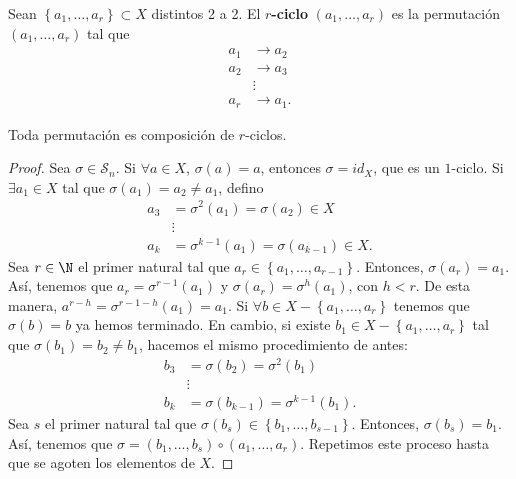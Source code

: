 \begin{fdefinition}[]
\normalfont Sean $\displaystyle \left\{ a_{1}, \ldots, a_{r}\right\} \subset X $ distintos 2 a 2. El \textbf{ $\displaystyle r $-ciclo} $\displaystyle \left(a_{1}, \ldots, a_{r}\right) $ es la permutación $\displaystyle \left(a_{1}, \ldots, a_{r}\right) $ tal que
\[
\begin{split}
	a_{1} & \to a_{2} \\
	a_{2} & \to a_{3} \\
	      & \vdots \\
	a_{r} & \to a_{1}.
\end{split}
\]
\end{fdefinition}

\begin{fprop}[]
\normalfont Toda permutación es composición de $\displaystyle r $-ciclos.
\end{fprop}

\begin{proof}
Sea $\displaystyle \sigma \in \mathcal{S}_{n} $. Si $\displaystyle \forall a \in X $, $\displaystyle \sigma\left(a\right)=a $, entonces $\displaystyle \sigma = id _{X} $, que es un $\displaystyle 1 $-ciclo. Si $\displaystyle \exists a_{1}\in X $ tal que $\displaystyle \sigma\left(a_{1}\right) = a_{2}\neq a_{1} $, defino
\[
\begin{split}
	a_{3} & = \sigma^{2}\left(a_{1}\right) = \sigma\left(a_{2}\right) \in X \\
	      & \vdots \\
	a_{k} & = \sigma^{k-1}\left(a_{1}\right) = \sigma\left(a_{k-1}\right) \in X.
\end{split}
\]
Sea $\displaystyle r \in \N $ el primer natural tal que $\displaystyle a_{r} \in \left\{ a_{1}, \ldots, a_{r-1}\right\}  $. Entonces, $\displaystyle \sigma\left(a_{r}\right) = a_{1} $. Así, tenemos que $a_{r} = \sigma^{r-1}\left(a_{1}\right)$ y $\displaystyle \sigma\left(a_{r}\right) = \sigma^{h}\left(a_{1}\right) $, con $\displaystyle h < r $. De esta manera, $\displaystyle a^{r-h} = \sigma^{r-1-h}\left(a_{1}\right) = a_{1} $. Si $\displaystyle \forall b \in X - \left\{ a_{1}, \ldots, a_{r}\right\}  $ tenemos que $\displaystyle \sigma\left(b\right) = b $ ya hemos terminado. En cambio, si existe $\displaystyle b_{1} \in X - \left\{ a_{1}, \ldots, a_{r}\right\}  $ tal que $\displaystyle \sigma\left(b_{1}\right) = b_{2} \neq b_{1} $, hacemos el mismo procedimiento de antes:
\[
\begin{split}
	b_{3} & = \sigma\left(b_{2}\right) = \sigma^{2}\left(b_{1}\right) \\
				 & \vdots \\
	b_{k} & = \sigma\left(b_{k-1}\right) = \sigma^{k-1}\left(b_{1}\right).
\end{split}
\]
Sea $\displaystyle s $ el primer natural tal que $\displaystyle \sigma\left(b_{s}\right) \in \left\{ b_{1}, \ldots, b_{s-1}\right\}  $. Entonces, $\displaystyle \sigma\left(b_{s}\right)= b_{1} $. Así, tenemos que $\displaystyle \sigma = \left(b_{1}, \ldots, b_{s}\right) \circ \left(a_{1}, \ldots, a_{r}\right) $. Repetimos este proceso hasta que se agoten los elementos de $\displaystyle X $.
\end{proof}


